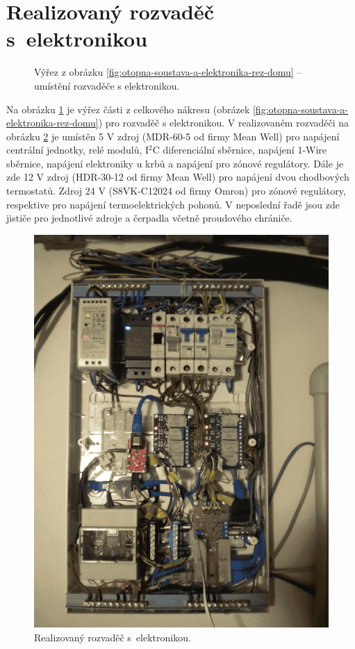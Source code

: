 \section{Realizovaný rozvaděč s~elektronikou}
\begin{figure}[H]
   \centering
   \def\svgwidth{0.5\columnwidth}
   
    \caption[Výřez pro umístění rozvaděče s elektronikou.]{Výřez z obrázku \ref{fig:otopna-soustava-a-elektronika-rez-domu} – umístění rozvaděče s elektronikou.}
    \label{fig:vyrez-rozvadec}
\end{figure}

Na obrázku \ref{fig:vyrez-rozvadec} je výřez části z celkového nákresu (obrázek \ref{fig:otopna-soustava-a-elektronika-rez-domu}) pro rozvaděč s elektronikou. V realizovaném rozvaděči na obrázku \ref{fig:rozvadec-ve-sklepe-s-elektronikou} je umístěn 5 V zdroj (MDR-60-5 \cite{mdr-60-5} od firmy Mean Well) pro napájení centrální jednotky, relé modulů, I$^2$C diferenciální sběrnice, napájení 1-Wire sběrnice, napájení elektroniky u krbů a napájení pro zónové regulátory. Dále je zde 12 V zdroj (HDR-30-12 \cite{hdr-30-12} od firmy Mean Well) pro napájení dvou chodbových termostatů. Zdroj 24 V (S8VK-C12024 \cite{s8vk-c12024} od firmy Omron) pro zónové regulátory, respektive pro napájení termoelektrických pohonů. V  neposlední řadě jsou zde jističe pro jednotlivé zdroje a čerpadla včetně proudového chrániče.

\begin{figure}[H]
    \centering
    \includegraphics[width=\textwidth]{images/rozvadec-ve-sklepe-s-elektronikou.png}
    \caption{Realizovaný rozvaděč s~elektronikou.}
    \label{fig:rozvadec-ve-sklepe-s-elektronikou}
\end{figure}